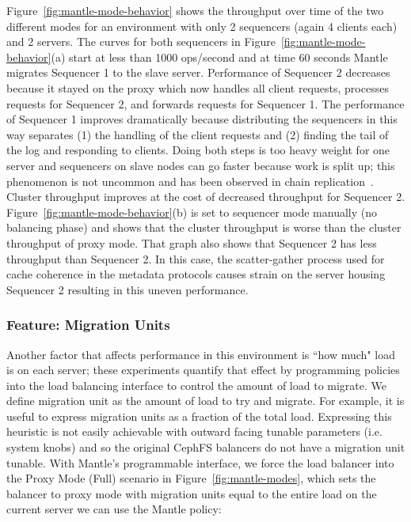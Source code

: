 \documentclass[preprint]{sigplanconf-eurosys}
\begin{document}
Figure~\ref{fig:mantle-mode-behavior} shows the throughput over time of the two
different modes for an environment with only 2 sequencers (again 4 clients
each) and 2 servers. The curves for both sequencers in
Figure~\ref{fig:mantle-mode-behavior}(a) start at less than 1000 ops/second and
at time 60 seconds Mantle migrates Sequencer 1 to the slave server.
Performance of Sequencer 2 decreases because it stayed on the proxy which now
handles all client requests, processes requests for Sequencer 2, and forwards
requests for Sequencer 1. The performance of Sequencer 1 improves dramatically
because distributing the sequencers in this way separates (1) the handling of
the client requests and (2) finding the tail of the log and responding to
clients.  Doing both steps is too heavy weight for one server and sequencers on
slave nodes can go faster because work is split up; this phenomenon is not
uncommon and has been observed in chain replication~\cite{CITEME}.  Cluster
throughput improves at the cost of decreased throughput for Sequencer 2.
Figure~\ref{fig:mantle-mode-behavior}(b) is set to sequencer mode manually (no
balancing phase) and shows that the cluster throughput is worse than the
cluster throughput of proxy mode. That graph also shows that Sequencer 2 has
less throughput than Sequencer 2. In this case, the scatter-gather process used
for cache coherence in the metadata protocols causes strain on the server
housing Sequencer 2 resulting in this uneven performance. 

\subsubsection{Feature: Migration Units}
\label{sec:feature-migration-units}

Another factor that affects performance in this environment is ``how much" load
is on each server; these experiments quantify that effect by programming
policies into the load balancing interface to control the amount of load to
migrate. We define migration unit as the amount of load to try and migrate.
For example, it is useful to express migration units as a fraction of the total
load.  Expressing this heuristic is not easily achievable with outward facing
tunable parameters (i.e. system knobs) and so the original CephFS balancers do
not have a migration unit tunable.  With Mantle's programmable interface, we
force the load balancer into the Proxy Mode (Full) scenario in
Figure~\ref{fig:mantle-modes}, which sets the balancer to proxy mode with
migration units equal to the entire load on the current server we can use the Mantle
policy:\\
\end{document}
